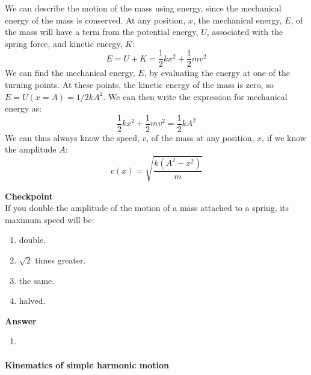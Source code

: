 We can describe the motion of the mass using energy, since the mechanical energy of the mass is conserved. At any position, $x$, the mechanical energy, $E$, of the mass will have a term from the potential energy, $U$, associated with the spring force, and kinetic energy, $K$:
\begin{equation}
E = U + K =\frac{1}{2}kx^2 + \frac{1}{2}mv^2
\end{equation}
We can find the mechanical energy, $E$, by evaluating the energy at one of the turning points. At these points, the  kinetic energy of the mass is zero, so $E=U(x=A)=1/2kA^2$. We can then write the expression for mechanical energy as:
\begin{equation}
\boxed{\frac{1}{2}kx^2 + \frac{1}{2}mv^2 = \frac{1}{2}kA^2}
\end{equation}
We can thus always know the speed, $v$, of the mass at any position, $x$, if we know the amplitude $A$:
\begin{equation}
v(x) = \sqrt{\frac{k(A^2-x^2)}{m}}
\end{equation}

\begin{framed}
\textbf{Checkpoint}\\
If you double the amplitude of the motion of a mass attached to a spring, its maximum speed will be:

\begin{enumerate}
\item double.
\item $\sqrt 2$ times greater.
\item the same.
\item halved.
\end{enumerate}

\begin{framed}
\textbf{Answer}\\
\begin{enumerate}
\item
\end{enumerate}
\end{framed}
\end{framed}

\paragraph{Kinematics of simple harmonic motion}

